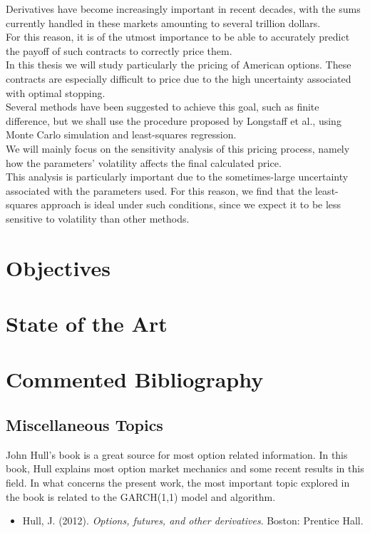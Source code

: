 \documentclass[a4paper,prd,twocolumn,nofootinbib,superscriptaddress,floatfix]{revtex4}
\begin{document}
\noindent Derivatives have become increasingly important in recent decades, with the sums currently handled in these markets amounting to several trillion dollars.\\
For this reason, it is of the utmost importance to be able to accurately predict the payoff of such contracts to correctly price them.\\
In this thesis we will study particularly the pricing of American options. These contracts are especially difficult to price due to the high uncertainty associated with optimal stopping.\\
Several methods have been suggested to achieve this goal, such as finite difference, but we shall use the procedure proposed by Longstaff et al., using Monte Carlo simulation and least-squares regression.\\
We will mainly focus on the sensitivity analysis of this pricing process, namely how the parameters’ volatility affects the final calculated price.\\
This analysis is particularly important due to the sometimes-large uncertainty associated with the parameters used. For this reason, we find that the least-squares approach is ideal under such conditions, since we expect it to be less sensitive to volatility than other methods.
\fi
\section{Objectives}

\section{State of the Art}

\section{Commented Bibliography}
\subsection{Miscellaneous Topics}
John Hull's book is a great source for most option related information. In this book, Hull explains most option market mechanics and some recent results in this field. In what concerns the present work, the most important topic explored in the book is related to the GARCH(1,1) model and algorithm.
\begin{itemize}
\item Hull, J. (2012). \textit{Options, futures, and other derivatives}. Boston: Prentice Hall.
\end{itemize}
\end{document}
